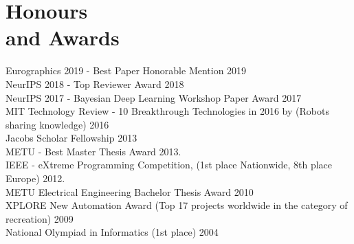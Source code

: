 
\section{\mysidestyle \textcolor{olgray}{Honours \\and Awards}}
Eurographics 2019 - Best Paper Honorable Mention \hfill 2019 \vspace{1mm}\\
NeurIPS 2018 - Top Reviewer Award \hfill 2018 \vspace{1mm}\\
NeurIPS 2017 - Bayesian Deep Learning Workshop Paper Award \hfill 2017 \vspace{1mm}\\
MIT Technology Review - 10 Breakthrough Technologies in 2016 by  (Robots sharing knowledge) \hfill 2016 \vspace{1mm}\\
Jacobs Scholar Fellowship \hfill 2013 \vspace{1mm}\\
METU - Best Master Thesis Award \hfill  2013{\color{white}.}\vspace{1mm}\\
IEEE - eXtreme Programming Competition,  (1st place Nationwide, 8th place Europe) \hfill 2012{\color{white}.}\vspace{1mm}\\
METU Electrical Engineering Bachelor Thesis Award  \hfill 2010 \vspace{1mm}\vspace{1mm}\\
XPLORE New Automation Award (Top 17 projects worldwide in the category of recreation)  \hfill 2009 \vspace{1mm}\vspace{1mm}\\
National Olympiad in Informatics (1st place) \hfill 2004 \vspace{1mm}\vspace{1mm}\\
\vspace{-4mm}
